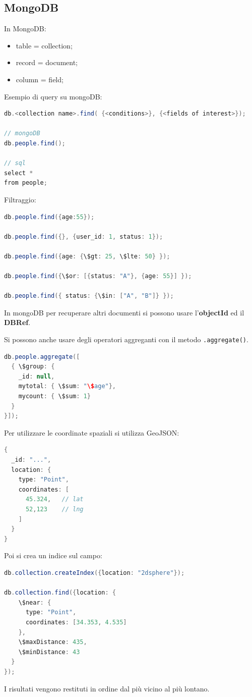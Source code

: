 \documentclass[12pt]{article}
\begin{document}
\subsection{MongoDB}
In MongoDB:
\begin{itemize}
    \item table = collection;
    \item record = document;
    \item column = field;
\end{itemize}
Esempio di query su mongoDB:
\begin{lstlisting}[language=java]
db.<collection name>.find( {<conditions>}, {<fields of interest>});

// mongoDB
db.people.find();

// sql
select *
from people;
\end{lstlisting}
Filtraggio:
\begin{lstlisting}[language=java]
db.people.find({age:55});

db.people.find({}, {user_id: 1, status: 1});

db.people.find({age: {\$gt: 25, \$lte: 50} });

db.people.find({\$or: [{status: "A"}, {age: 55}] });

db.people.find({ status: {\$in: ["A", "B"]} });
\end{lstlisting}
In mongoDB per recuperare altri documenti si possono usare l'\textbf{objectId} ed il \textbf{DBRef}.

Si possono anche usare degli operatori aggreganti con il metodo \texttt{.aggregate()}.
\begin{lstlisting}[language=java]
db.people.aggregate([
  { \$group: {
    _id: null,
    mytotal: { \$sum: "\$age"},
    mycount: { \$sum: 1}
  }
}]);
\end{lstlisting}
Per utilizzare le coordinate spaziali si utilizza GeoJSON:
\begin{lstlisting}[language=java]
{
  _id: "...",
  location: {
    type: "Point",
    coordinates: [
      45.324,   // lat
      52,123    // lng
    ] 
  }
}
\end{lstlisting}
Poi si crea un indice sul campo:
\begin{lstlisting}[language=java]
db.collection.createIndex({location: "2dsphere"});

db.collection.find({location: {
    \$near: {
      type: "Point",
      coordinates: [34.353, 4.535]
    },
    \$maxDistance: 435,
    \$minDistance: 43
  }
});
\end{lstlisting}
I risultati vengono restituti in ordine dal pi\`u vicino al pi\`u lontano.
\end{document}
